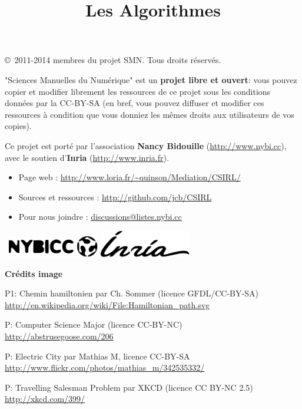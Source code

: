 \documentclass[a5paper,pagesize,DIV=14]{scrbook}
\title{Les Algorithmes}
\date{}
\begin{document}



\copyright\ 2011-2014 membres du projet SMN. Tous droits réservés.
  
"Sciences Manuelles du Numérique" est un \textbf{projet libre et ouvert}: vous
pouvez copier et modifier librement les ressources de ce projet sous les
conditions données par la CC-BY-SA (en bref, vous pouvez diffuser et modifier
ces ressources à condition que vous donniez les mêmes droits aux utilisateurs de
vos copies).

\bigskip

Ce projet est porté par l'association \textbf{Nancy Bidouille}
(\url{http://www.nybi.cc}), avec le soutien d'\textbf{Inria}
(\url{http://www.inria.fr}).
  
\bigskip

\begin{itemize}
\item Page web : \url{http://www.loria.fr/~quinson/Mediation/CSIRL/}
\item Sources et ressources : \url{http://github.com/jcb/CSIRL}
\item Pour nous joindre : \url{discussions@listes.nybi.cc}
\end{itemize}

\bigskip
~\hfill\includegraphics[width=0.3\textwidth]{img/logo_nybicc.pdf}\hfill
\includegraphics[width=0.3\textwidth]{img/logo_inria.pdf}\hfill~

\vfill
\textbf{Crédits image}

{\footnotesize

P1: Chemin hamiltonien par Ch. Sommer (licence GFDL/CC-BY-SA)\\
\url{http://en.wikipedia.org/wiki/File:Hamiltonian_path.svg}

P\pageref{img:CSmajor}: Computer Science Major (licence CC-BY-NC)\\
\url{http://abstrusegoose.com/206}


P\pageref{img:electric:city}: Electric City par Mathias M, licence CC-BY-SA
\url{http://www.flickr.com/photos/mathias_m/342535332/}
  
P\pageref{img:tsp_xkcd}: Travelling Salesman Problem par XKCD (licence CC BY-NC 2.5)\\
\url{http://xkcd.com/399/}
}
\end{document}
